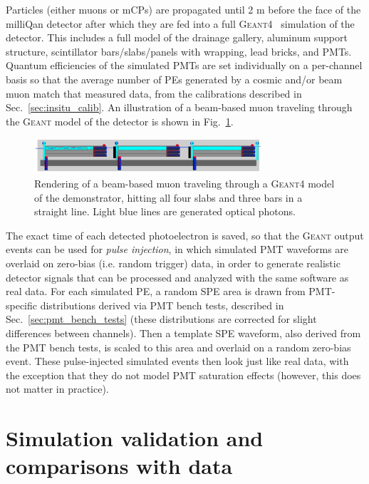 {Particles (either muons or mCPs) are propagated until 2 m before the face of the milliQan detector
after which they are fed into a full \textsc{Geant4}~\cite{geant4} simulation of the detector.
This includes a full model of the drainage gallery, aluminum support structure,
scintillator bars/slabs/panels with wrapping, lead bricks, and PMTs.
Quantum efficiencies of the simulated PMTs are set individually on a per-channel
basis so that the average number of PEs generated by a cosmic and/or beam 
muon match that measured data, from the calibrations described in 
Sec.~\ref{sec:insitu_calib}. An illustration of a beam-based muon
traveling through the \textsc{Geant} model of the detector is 
shown in Fig.~\ref{fig:mq_geant}.

\begin{figure}[t]
  \begin{center}
    \includegraphics[width=0.750\textwidth]{figs/milliq/geant.png}
    \caption{Rendering of a beam-based muon traveling through
      a \textsc{Geant4} model of the demonstrator, hitting all
      four slabs and three bars in a straight line. Light blue
      lines are generated optical photons.
            }
    \label{fig:mq_geant}
  \end{center}
\end{figure}

The exact time of each detected photoelectron is saved, so that the \textsc{Geant} output
events can be used for \textit{pulse injection}, in which simulated PMT waveforms
are overlaid on zero-bias (i.e. random trigger) data, in order to generate realistic
detector signals that can be processed and analyzed with the same software as real data.
For each simulated PE, a random SPE area is drawn from PMT-specific
distributions derived via PMT bench tests, described in Sec.~\ref{sec:pmt_bench_tests}
(these distributions are corrected for slight differences between channels).
Then a template SPE waveform, also derived from the PMT bench tests, is scaled to this
area and overlaid on a random zero-bias event. These pulse-injected simulated events
then look just like real data, with the exception that they do not model
PMT saturation effects (however, this does not matter in practice).

\section{Simulation validation and comparisons with data}

}
